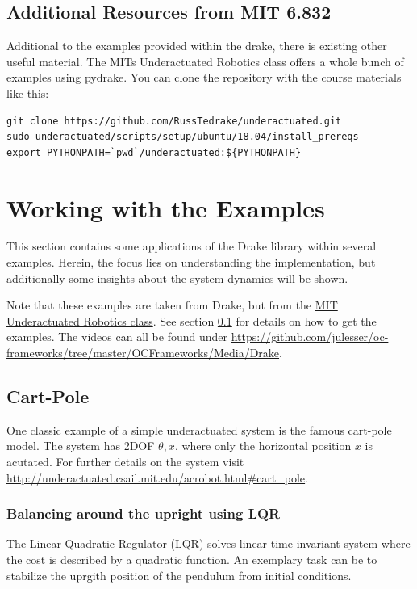 \subsection{Additional Resources from MIT 6.832}\label{subsec:mit}
Additional to the examples provided within the drake, there is existing other useful material. The MITs Underactuated Robotics class \cite{mitx6.832web} offers a whole bunch of examples using pydrake. You can clone the repository with the course materials like this:
\begin{verbatim}
git clone https://github.com/RussTedrake/underactuated.git
sudo underactuated/scripts/setup/ubuntu/18.04/install_prereqs
export PYTHONPATH=`pwd`/underactuated:${PYTHONPATH}
\end{verbatim}


\section{Working with the Examples}\label{sec:drakeExamples}
This section contains some applications of the Drake library within several examples. Herein, the focus lies on understanding the implementation, but additionally some insights about the system dynamics will be shown. 

Note that these examples are taken from Drake, but from the \href{http://underactuated.csail.mit.edu/underactuated.html}{MIT Underactuated Robotics class}. See section \ref{subsec:mit} for details on how to get the examples. The videos can all be found under \url{https://github.com/julesser/oc-frameworks/tree/master/OCFrameworks/Media/Drake}. 

\subsection{Cart-Pole}
One classic example of a simple underactuated system is the famous cart-pole model. The system has 2DOF $\theta, x$, where only the horizontal position $x$ is acutated. 
For further details on the system visit \url{http://underactuated.csail.mit.edu/acrobot.html#cart_pole}.
\subsubsection{Balancing around the upright using LQR}
The \href{http://underactuated.csail.mit.edu/lqr.html}{Linear Quadratic Regulator (LQR)} solves linear time-invariant system where the cost is described by a quadratic function.
An exemplary task can be to stabilize the uprgith position of the pendulum from initial conditions.

